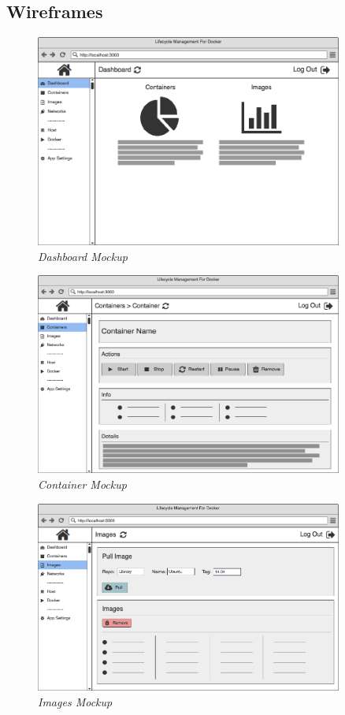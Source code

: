 \clearpage

\subsection{Wireframes}
\label{appendix:wireframes}

\begin{figure}[!ht]
\centering
\includegraphics*[width=0.9\textwidth]{wireframes/dashboard}
\caption{\em Dashboard Mockup}
\end{figure}

\begin{figure}[!ht]
\centering
\includegraphics*[width=0.9\textwidth]{wireframes/container}
\caption{\em Container Mockup}
\end{figure}

\begin{figure}[!ht]
\centering
\includegraphics*[width=0.9\textwidth]{wireframes/images}
\caption{\em Images Mockup}
\end{figure}

